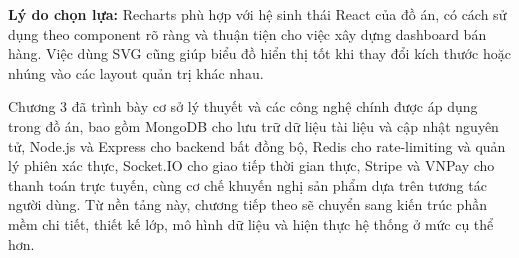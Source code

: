 \documentclass[../DoAn.tex]{subfiles}
\begin{document}
\textbf{Lý do chọn lựa:} Recharts phù hợp với hệ sinh thái React của đồ án, có cách sử dụng theo component rõ ràng và thuận tiện cho việc xây dựng dashboard bán hàng. Việc dùng SVG cũng giúp biểu đồ hiển thị tốt khi thay đổi kích thước hoặc nhúng vào các layout quản trị khác nhau.


Chương 3 đã trình bày cơ sở lý thuyết và các công nghệ chính được áp dụng trong đồ án, bao gồm MongoDB cho lưu trữ dữ liệu tài liệu và cập nhật nguyên tử, Node.js và Express cho backend bất đồng bộ, Redis cho rate-limiting và quản lý phiên xác thực, Socket.IO cho giao tiếp thời gian thực, Stripe và VNPay cho thanh toán trực tuyến, cùng cơ chế khuyến nghị sản phẩm dựa trên tương tác người dùng. Từ nền tảng này, chương tiếp theo sẽ chuyển sang kiến trúc phần mềm chi tiết, thiết kế lớp, mô hình dữ liệu và hiện thực hệ thống ở mức cụ thể hơn.
\end{document}

